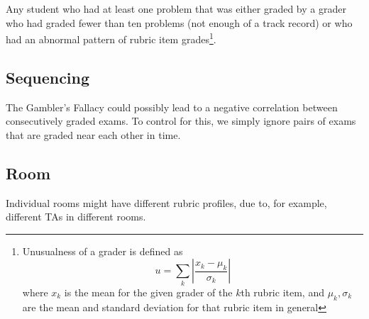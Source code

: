 \documentclass{article}
\begin{document}
        Any student who had at least one problem that was either graded by a grader who had graded fewer
            than ten problems (not enough of a track record) or who had an abnormal pattern of rubric item
            grades\footnote{Unusualness of a grader is defined as
                $$u = \sum_k \left|\frac{x_k - \mu_k}{\sigma_k}\right|$$ where $x_k$ is the mean for the 
                given grader of the $k$th rubric item, and $\mu_k, \sigma_k$ are the mean and standard
                deviation for that rubric item in general}.
    \subsection{Sequencing}
        The Gambler's Fallacy could possibly lead to a negative correlation between consecutively graded
            exams. To control for this, we simply ignore pairs of exams that are graded near each other in
            time.
    \subsection{Room}
        Individual rooms might have different rubric profiles, due to, for example, different TAs in
            different rooms.
\end{document}
